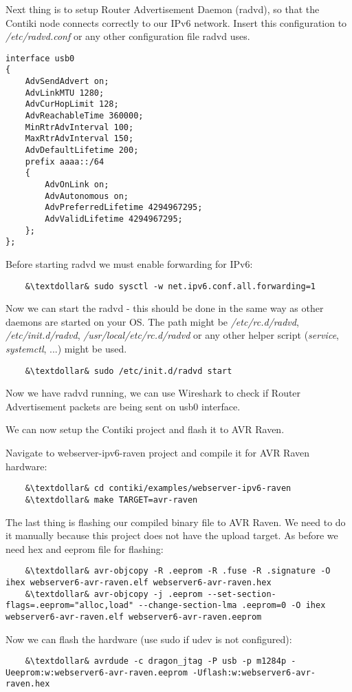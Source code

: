 \documentclass{article}
\begin{document}
Next thing is to setup Router Advertisement Daemon (radvd), so that the Contiki node connects correctly to our IPv6 network.
Insert this configuration to {\it{/etc/radvd.conf}} or any other configuration file radvd uses.
\begin{lstlisting}
interface usb0
{
    AdvSendAdvert on;
    AdvLinkMTU 1280;
    AdvCurHopLimit 128;
    AdvReachableTime 360000;
    MinRtrAdvInterval 100;
    MaxRtrAdvInterval 150;
    AdvDefaultLifetime 200;
    prefix aaaa::/64
    {
        AdvOnLink on;
        AdvAutonomous on;
        AdvPreferredLifetime 4294967295; 
        AdvValidLifetime 4294967295; 
    };
};
\end{lstlisting}
Before starting radvd we must enable forwarding for IPv6:
\begin{lstlisting}
	&\textdollar& sudo sysctl -w net.ipv6.conf.all.forwarding=1
\end{lstlisting}
Now we can start the radvd - this should be done in the same way as other daemons are started on your OS.
The path might be {\it{/etc/rc.d/radvd}}, {\it{/etc/init.d/radvd}}, {\it{/usr/local/etc/rc.d/radvd}}
or any other helper script ({\it{service}}, {\it{systemctl}}, ...) might be used.
\begin{lstlisting}
	&\textdollar& sudo /etc/init.d/radvd start
\end{lstlisting}

Now we have radvd running, we can use Wireshark to check if Router Advertisement packets are being sent on usb0 interface.


We can now setup the Contiki project and flash it to AVR Raven.

Navigate to webserver-ipv6-raven project and compile it for AVR Raven hardware:
\begin{lstlisting}
	&\textdollar& cd contiki/examples/webserver-ipv6-raven
	&\textdollar& make TARGET=avr-raven
\end{lstlisting}


The last thing is flashing our compiled binary file to AVR Raven. We need to do it manually because this project does not have the upload target.
As before we need hex and eeprom file for flashing:
\begin{lstlisting}
	&\textdollar& avr-objcopy -R .eeprom -R .fuse -R .signature -O ihex webserver6-avr-raven.elf webserver6-avr-raven.hex
	&\textdollar& avr-objcopy -j .eeprom --set-section-flags=.eeprom="alloc,load" --change-section-lma .eeprom=0 -O ihex webserver6-avr-raven.elf webserver6-avr-raven.eeprom
\end{lstlisting}
Now we can flash the hardware (use sudo if udev is not configured):
\begin{lstlisting}
	&\textdollar& avrdude -c dragon_jtag -P usb -p m1284p -Ueeprom:w:webserver6-avr-raven.eeprom -Uflash:w:webserver6-avr-raven.hex
\end{lstlisting}
\end{document}
